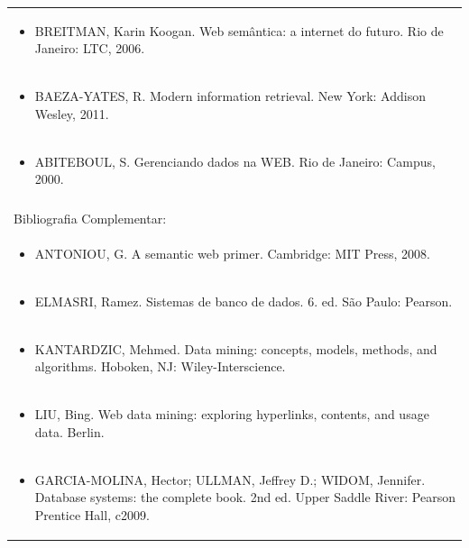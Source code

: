 \documentclass[11pt]{article}
\begin{document}
\begin{center}
\begin{longtable}{|p{4cm}|p{4cm}|p{4cm}|p{4cm}|}
\multicolumn{4}{|p{\dimexpr 16cm + 6\tabcolsep\relax}|}{\begin{itemize}\item BREITMAN, Karin Koogan. Web semântica: a internet do futuro. Rio de Janeiro: LTC, 2006.\end{itemize}}\\
\multicolumn{4}{|p{\dimexpr 16cm + 6\tabcolsep\relax}|}{\begin{itemize}\item BAEZA-YATES, R. Modern information retrieval. New York: Addison Wesley, 2011.\end{itemize}}\\
\multicolumn{4}{|p{\dimexpr 16cm + 6\tabcolsep\relax}|}{\begin{itemize}\item ABITEBOUL, S. Gerenciando dados na WEB. Rio de Janeiro: Campus, 2000.\end{itemize}}\\
\multicolumn{4}{|p{16cm}|}{}\\
\hline
\multicolumn{4}{|p{16cm}|}{Bibliografia Complementar:}\\*
\multicolumn{4}{|p{\dimexpr 16cm + 6\tabcolsep\relax}|}{\begin{itemize}\item ANTONIOU, G. A semantic web primer. Cambridge: MIT Press, 2008.\end{itemize}}\\
\multicolumn{4}{|p{\dimexpr 16cm + 6\tabcolsep\relax}|}{\begin{itemize}\item ELMASRI, Ramez. Sistemas de banco de dados. 6. ed. São Paulo: Pearson.\end{itemize}}\\
\multicolumn{4}{|p{\dimexpr 16cm + 6\tabcolsep\relax}|}{\begin{itemize}\item KANTARDZIC, Mehmed. Data mining: concepts, models, methods, and algorithms. Hoboken, NJ: Wiley-Interscience.\end{itemize}}\\
\multicolumn{4}{|p{\dimexpr 16cm + 6\tabcolsep\relax}|}{\begin{itemize}\item LIU, Bing. Web data mining: exploring hyperlinks, contents, and usage data. Berlin.\end{itemize}}\\
\multicolumn{4}{|p{\dimexpr 16cm + 6\tabcolsep\relax}|}{\begin{itemize}\item GARCIA-MOLINA, Hector; ULLMAN, Jeffrey D.; WIDOM, Jennifer. Database systems: the complete book. 2nd ed. Upper Saddle River: Pearson Prentice Hall, c2009.\end{itemize}}\\
\hline
\end{longtable}
\end{center}
\end{document}
